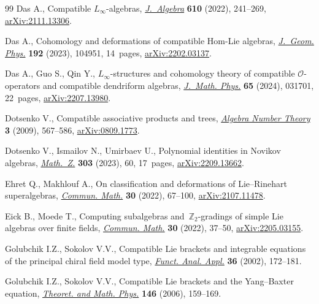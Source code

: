 \documentclass[10pt,a4paper]{amsart}
\numberwithin{equation}{section}
\begin{document}
\begin{thebibliography}{99}
Das A., Compatible {$L_\infty$}-algebras, \href{https://doi.org/10.1016/j.jalgebra.2022.07.020}{\textit{J.~Algebra}} \textbf{610}
 (2022), 241--269, \href{https://arxiv.org/abs/2111.13306}{arXiv:2111.13306}.

Das A., Cohomology and deformations of compatible {H}om-{L}ie algebras,
 \href{https://doi.org/10.1016/j.geomphys.2023.104951}{\textit{J.~Geom. Phys.}} \textbf{192} (2023), 104951, 14~pages,
 \href{https://arxiv.org/abs/2202.03137}{arXiv:2202.03137}.

Das A., Guo S., Qin Y., {$L_\infty$}-structures and cohomology theory of
 compatible {$\mathcal{O}$}-operators and compatible dendriform algebras,
 \href{https://doi.org/10.1063/5.0161898}{\textit{J.~Math. Phys.}} \textbf{65} (2024), 031701, 22~pages,
 \href{https://arxiv.org/abs/2207.13980}{arXiv:2207.13980}.

Dotsenko V., Compatible associative products and trees, \href{https://doi.org/10.2140/ant.2009.3.567}{\textit{Algebra Number
 Theory}} \textbf{3} (2009), 567--586, \href{https://arxiv.org/abs0809.1773}{arXiv:0809.1773}.

Dotsenko V., Ismailov N., Umirbaev U., Polynomial identities in {N}ovikov
 algebras, \href{https://doi.org/10.1007/s00209-023-03231-8}{\textit{Math.~Z.}} \textbf{303} (2023), 60, 17~pages,
 \href{https://arxiv.org/abs/2209.13662}{arXiv:2209.13662}.

Ehret Q., Makhlouf A., On classification and deformations of {L}ie--{R}inehart
 superalgebras, \href{https://doi.org/10.46298/cm.10537}{\textit{Commun. Math.}} \textbf{30} (2022), 67--100,
 \href{https://arxiv.org/abs/2107.11478}{arXiv:2107.11478}.

Eick B., Moede T., Computing subalgebras and~{$\mathbb Z_2$}-gradings of simple
 {L}ie algebras over finite fields, \href{https://doi.org/10.46298/cm.10193}{\textit{Commun. Math.}} \textbf{30} (2022),
 37--50, \href{https://arxiv.org/abs/2205.03155}{arXiv:2205.03155}.

Golubchik I.Z., Sokolov V.V., Compatible {L}ie brackets and integrable
 equations of the principal chiral field model type, \href{https://doi.org/10.1023/A:1020141820038}{\textit{Funct. Anal.
 Appl.}} \textbf{36} (2002), 172--181.

Golubchik I.Z., Sokolov V.V., Compatible {L}ie brackets and the
 {Y}ang--{B}axter equation, \href{https://doi.org/10.1007/s11232-006-0016-6}{\textit{Theoret. and Math. Phys.}} \textbf{146}
 (2006), 159--169.


\end{thebibliography}
\end{document}
